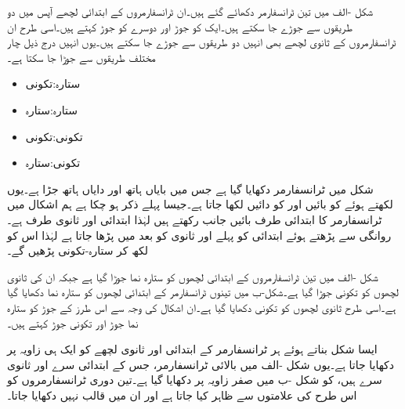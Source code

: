 شکل -الف میں تین ٹرانسفارمر دکھائے گئے ہیں۔ان ٹرانسفارمروں کے ابتدائی لچھے آپس میں دو طریقوں سے جوڑے جا سکتے ہیں۔ایک کو  جوڑ   اور دوسرے کو  جوڑ     کہتے ہیں۔اسی طرح ان ٹرانسفارمروں کے ثانوی  لچھے بھی انہیں دو طریقوں سے جوڑے جا سکتے ہیں۔یوں انہیں درج ذیل چار مختلف طریقوں سے جوڑا جا سکتا ہے۔
\begin{itemize}
\item
ستارہ:تکونی  \quad {}
\item
ستارہ:ستارہ \quad  {}
\item
تکونی:تکونی \quad  {}
\item
تکونی:ستارہ  \quad  {}
\end{itemize}

شکل  میں  ٹرانسفارمر دکھایا گیا ہے جس میں بایاں ہاتھ  اور دایاں ہاتھ  جڑا ہے۔یوں  لکھتے ہوئے  کو بائیں اور  کو دائیں لکھا جاتا ہے۔جیسا پہلے ذکر ہو چکا ہے ہم  اشکال میں ٹرانسفارمر کا ابتدائی طرف  بائیں جانب رکھتے ہیں لہٰذا  ابتدائی اور  ثانوی طرف ہے۔ روانگی سے پڑھتے ہوئے ابتدائی کو پہلے اور ثانوی کو بعد میں پڑھا جاتا ہے لہٰذا اس کو  لکھ کر  ستارہ-تکونی پڑھیں گے۔

شکل -الف میں تین ٹرانسفارمروں کے ابتدائی لچھوں کو ستارہ نما جوڑا گیا ہے جبکہ ان کی ثانوی لچھوں کو تکونی جوڑا گیا ہے۔شکل-ب میں تینوں ٹرانسفارمر کے ابتدائی لچھوں کو  ستارہ نما  دکھایا گیا ہے۔اسی طرح ثانوی لچھوں کو تکونی  دکھایا گیا ہے۔ان اشکال کی وجہ سے اس طرز کے جوڑ  کو ستارہ نما جوڑ اور تکونی جوڑ کہتے ہیں۔

ایسا شکل بناتے ہوئے ہر ٹرانسفارمر کے  ابتدائی اور ثانوی لچھے کو ایک ہی زاویہ پر دکھایا جاتا ہے۔یوں شکل -الف میں بالائی ٹرانسفارمر، جس کے ابتدائی سرے  اور ثانوی  سرے  ہیں، کو شکل -ب میں صفر زاویہ پر دکھایا  گیا ہے۔تین  دوری ٹرانسفارمروں کو اس طرح کی علامتوں سے ظاہر کیا جاتا ہے اور ان میں قالب نہیں دکھایا جاتا۔

